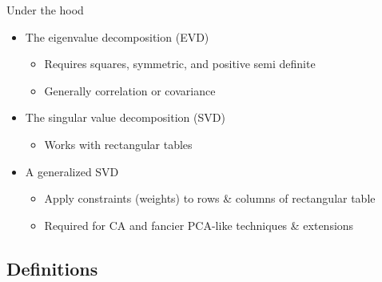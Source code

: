 \documentclass[
  ignorenonframetext,
]{beamer}
\providecommand{\tightlist}{%
  \setlength{\itemsep}{0pt}\setlength{\parskip}{0pt}}
\begin{document}
\begin{frame}{Under the hood}
\protect\hypertarget{under-the-hood}{}

\begin{itemize}[<+->]
\tightlist
\item
  The eigenvalue decomposition (EVD)

  \begin{itemize}[<+->]
  \tightlist
  \item
    Requires squares, symmetric, and positive semi definite
  \item
    Generally correlation or covariance
  \end{itemize}
\item
  The singular value decomposition (SVD)

  \begin{itemize}[<+->]
  \tightlist
  \item
    Works with rectangular tables
  \end{itemize}
\item
  A generalized SVD

  \begin{itemize}[<+->]
  \tightlist
  \item
    Apply constraints (weights) to rows \& columns of rectangular table
  \item
    Required for CA and fancier PCA-like techniques \& extensions
  \end{itemize}
\end{itemize}

\end{frame}

\hypertarget{definitions}{%
\subsection{Definitions}\label{definitions}}
\end{document}
